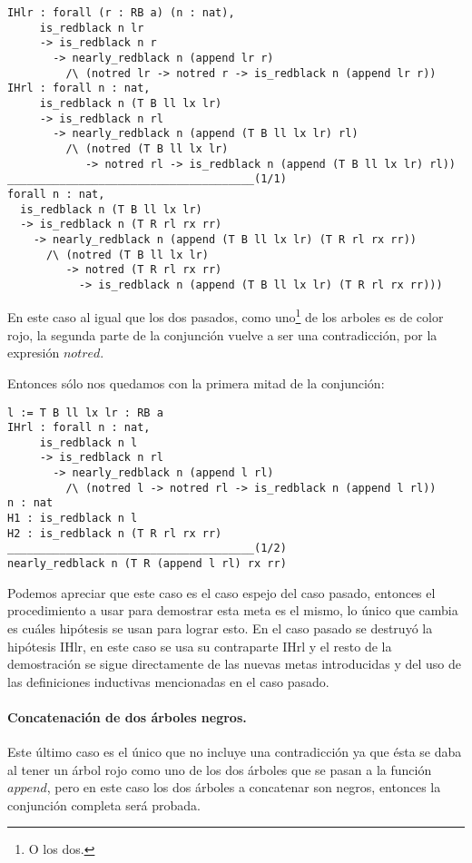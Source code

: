 \begin{verbatim}
IHlr : forall (r : RB a) (n : nat),
     is_redblack n lr
     -> is_redblack n r
       -> nearly_redblack n (append lr r)
         /\ (notred lr -> notred r -> is_redblack n (append lr r))
IHrl : forall n : nat,
     is_redblack n (T B ll lx lr)
     -> is_redblack n rl
       -> nearly_redblack n (append (T B ll lx lr) rl)
         /\ (notred (T B ll lx lr)
            -> notred rl -> is_redblack n (append (T B ll lx lr) rl))
______________________________________(1/1)
forall n : nat,
  is_redblack n (T B ll lx lr)
  -> is_redblack n (T R rl rx rr)
    -> nearly_redblack n (append (T B ll lx lr) (T R rl rx rr))
      /\ (notred (T B ll lx lr)
         -> notred (T R rl rx rr)
           -> is_redblack n (append (T B ll lx lr) (T R rl rx rr)))
\end{verbatim}

En este caso al igual que los dos pasados, como uno\footnote{O los dos.} de los arboles es de
color rojo, la segunda parte de la conjunci\'on vuelve a ser una contradicci\'on, por la expresión
$notred$.

Entonces s\'olo nos quedamos con la primera mitad de la conjunci\'on:

\begin{verbatim}
l := T B ll lx lr : RB a
IHrl : forall n : nat,
     is_redblack n l
     -> is_redblack n rl
       -> nearly_redblack n (append l rl)
         /\ (notred l -> notred rl -> is_redblack n (append l rl))
n : nat
H1 : is_redblack n l
H2 : is_redblack n (T R rl rx rr)
______________________________________(1/2)
nearly_redblack n (T R (append l rl) rx rr)
\end{verbatim}

Podemos apreciar que este caso es el caso espejo del caso pasado, entonces el procedimiento a usar
para demostrar esta meta es el mismo, lo \'unico que cambia es cu\'ales hip\'otesis se usan para
lograr esto. En el caso pasado se destruy\'o la hip\'otesis IHlr, en este caso se usa su contraparte
IHrl y el resto de la demostraci\'on se sigue directamente de las nuevas metas introducidas y del
uso de las definiciones inductivas mencionadas en el caso pasado.

\paragraph{Concatenaci\'on de dos \'arboles negros.}

Este \'ultimo caso es el \'unico que no incluye una contradicci\'on ya que \'esta se
daba al tener un \'arbol rojo como uno de los dos \'arboles que se pasan a la funci\'on 
\hyperref[func_app]{$append$}, pero en este caso los dos \'arboles a concatenar son negros, entonces 
la conjunci\'on completa ser\'a probada.

